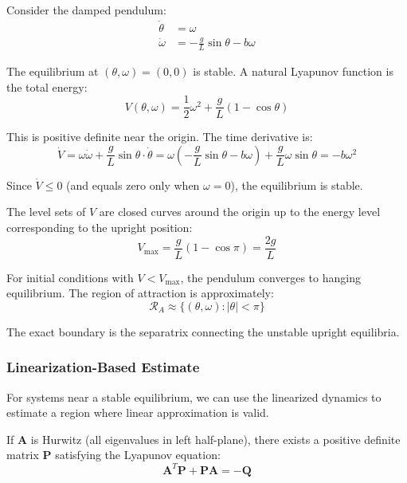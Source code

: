 \begin{example}
\label{ex:roa_pendulum}
Consider the damped pendulum:
\begin{align}
\dot{\theta} &= \omega \\
\dot{\omega} &= -\frac{g}{L}\sin\theta - b\omega
\end{align}

The equilibrium at $(\theta, \omega) = (0, 0)$ is stable. A natural Lyapunov function is the total energy:
\begin{equation}
V(\theta, \omega) = \frac{1}{2}\omega^2 + \frac{g}{L}(1 - \cos\theta)
\end{equation}

This is positive definite near the origin. The time derivative is:
\begin{equation}
\dot{V} = \omega\dot{\omega} + \frac{g}{L}\sin\theta \cdot \dot{\theta} = \omega\left(-\frac{g}{L}\sin\theta - b\omega\right) + \frac{g}{L}\omega\sin\theta = -b\omega^2
\end{equation}

Since $\dot{V} \leq 0$ (and equals zero only when $\omega = 0$), the equilibrium is stable.

The level sets of $V$ are closed curves around the origin up to the energy level corresponding to the upright position:
\begin{equation}
V_{\max} = \frac{g}{L}(1 - \cos\pi) = \frac{2g}{L}
\end{equation}

For initial conditions with $V < V_{\max}$, the pendulum converges to hanging equilibrium. The region of attraction is approximately:
\begin{equation}
\mathcal{R}_A \approx \{(\theta, \omega) : |\theta| < \pi\}
\end{equation}

The exact boundary is the separatrix connecting the unstable upright equilibria.
\end{example}

\subsubsection{Linearization-Based Estimate}

For systems near a stable equilibrium, we can use the linearized dynamics to estimate a region where linear approximation is valid.

If $\mathbf{A}$ is Hurwitz (all eigenvalues in left half-plane), there exists a positive definite matrix $\mathbf{P}$ satisfying the Lyapunov equation:
\begin{equation}
\mathbf{A}^T\mathbf{P} + \mathbf{P}\mathbf{A} = -\mathbf{Q}
\end{equation}

